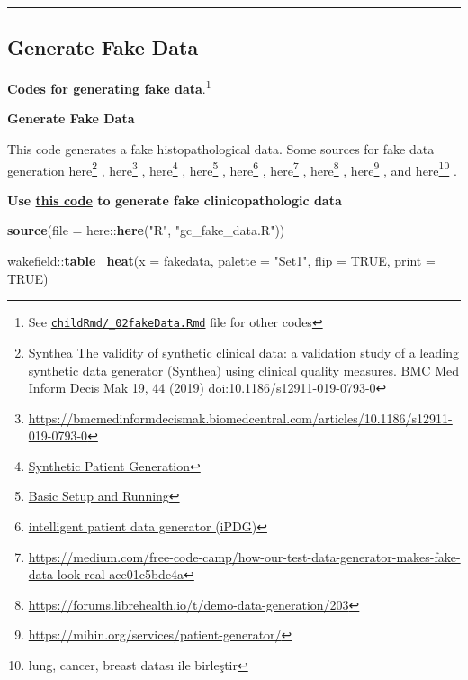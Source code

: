 \documentclass[
]{article}
\newenvironment{Shaded}{\begin{snugshade}}{\end{snugshade}}
\newcommand{\DataTypeTok}[1]{\textcolor[rgb]{0.00,0.34,0.68}{#1}}
\newcommand{\KeywordTok}[1]{\textcolor[rgb]{0.12,0.11,0.11}{\textbf{#1}}}
\newcommand{\NormalTok}[1]{\textcolor[rgb]{0.12,0.11,0.11}{#1}}
\newcommand{\OperatorTok}[1]{\textcolor[rgb]{0.12,0.11,0.11}{#1}}
\newcommand{\OtherTok}[1]{\textcolor[rgb]{0.00,0.43,0.16}{#1}}
\newcommand{\StringTok}[1]{\textcolor[rgb]{0.75,0.01,0.01}{#1}}
\begin{document}
\begin{center}\rule{0.5\linewidth}{0.5pt}\end{center}

\hypertarget{generate-fake-data}{%
\subsection{Generate Fake Data}\label{generate-fake-data}}

\textbf{Codes for generating fake data}.\footnote{See
  \href{https://github.com/sbalci/histopathology-template/blob/master/childRmd/_02fakeData.Rmd}{\texttt{childRmd/\_02fakeData.Rmd}}
  file for other codes}

\textbf{Generate Fake Data}

This code generates a fake histopathological data. Some sources for fake
data generation here\footnote{Synthea The validity of synthetic clinical
  data: a validation study of a leading synthetic data generator
  (Synthea) using clinical quality measures. BMC Med Inform Decis Mak
  19, 44 (2019) \url{doi:10.1186/s12911-019-0793-0}} , here\footnote{\url{https://bmcmedinformdecismak.biomedcentral.com/articles/10.1186/s12911-019-0793-0}}
, here\footnote{\href{https://synthetichealth.github.io/synthea/}{Synthetic
  Patient Generation}} , here\footnote{\href{https://github.com/synthetichealth/synthea/wiki/Basic-Setup-and-Running}{Basic
  Setup and Running}} , here\footnote{\href{http://www.mli.gmu.edu/index.php/research/ipdg/}{intelligent
  patient data generator (iPDG)}} , here\footnote{\url{https://medium.com/free-code-camp/how-our-test-data-generator-makes-fake-data-look-real-ace01c5bde4a}}
, here\footnote{\url{https://forums.librehealth.io/t/demo-data-generation/203}}
, here\footnote{\url{https://mihin.org/services/patient-generator/}} ,
and here\footnote{lung, cancer, breast datası ile birleştir} .

\textbf{Use
\href{https://github.com/sbalci/histopathology-template/blob/master/R/gc_fake_data.R}{this
code} to generate fake clinicopathologic data}

\begin{Shaded}
\begin{Highlighting}[]
\KeywordTok{source}\NormalTok{(}\DataTypeTok{file =}\NormalTok{ here}\OperatorTok{::}\KeywordTok{here}\NormalTok{(}\StringTok{"R"}\NormalTok{, }\StringTok{"gc_fake_data.R"}\NormalTok{))}
\end{Highlighting}
\end{Shaded}

\begin{Shaded}
\begin{Highlighting}[]
\NormalTok{wakefield}\OperatorTok{::}\KeywordTok{table_heat}\NormalTok{(}\DataTypeTok{x =}\NormalTok{ fakedata, }\DataTypeTok{palette =} \StringTok{"Set1"}\NormalTok{, }\DataTypeTok{flip =} \OtherTok{TRUE}\NormalTok{, }\DataTypeTok{print =} \OtherTok{TRUE}\NormalTok{)}
\end{Highlighting}
\end{Shaded}
\end{document}
